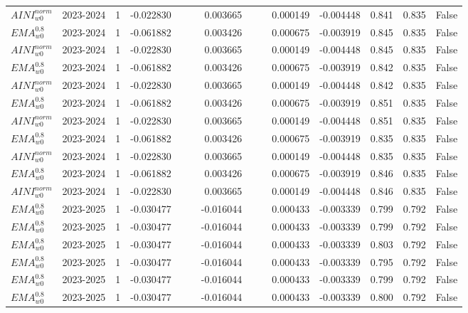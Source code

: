 \begin{tabular}{@{}llrrrrrrrrrlll@{}}
$AINI^{norm}_{w0}$ & 2023-2024 & 1 & -0.022830 &  &  & 0.003665 &  &  & 0.000149 & -0.004448 & 0.841 & 0.835 & False \\
$EMA^{0.8}_{w0}$ & 2023-2024 & 1 & -0.061882 &  &  & 0.003426 &  &  & 0.000675 & -0.003919 & 0.845 & 0.835 & False \\
$AINI^{norm}_{w0}$ & 2023-2024 & 1 & -0.022830 &  &  & 0.003665 &  &  & 0.000149 & -0.004448 & 0.845 & 0.835 & False \\
$EMA^{0.8}_{w0}$ & 2023-2024 & 1 & -0.061882 &  &  & 0.003426 &  &  & 0.000675 & -0.003919 & 0.842 & 0.835 & False \\
$AINI^{norm}_{w0}$ & 2023-2024 & 1 & -0.022830 &  &  & 0.003665 &  &  & 0.000149 & -0.004448 & 0.842 & 0.835 & False \\
$EMA^{0.8}_{w0}$ & 2023-2024 & 1 & -0.061882 &  &  & 0.003426 &  &  & 0.000675 & -0.003919 & 0.851 & 0.835 & False \\
$AINI^{norm}_{w0}$ & 2023-2024 & 1 & -0.022830 &  &  & 0.003665 &  &  & 0.000149 & -0.004448 & 0.851 & 0.835 & False \\
$EMA^{0.8}_{w0}$ & 2023-2024 & 1 & -0.061882 &  &  & 0.003426 &  &  & 0.000675 & -0.003919 & 0.835 & 0.835 & False \\
$AINI^{norm}_{w0}$ & 2023-2024 & 1 & -0.022830 &  &  & 0.003665 &  &  & 0.000149 & -0.004448 & 0.835 & 0.835 & False \\
$EMA^{0.8}_{w0}$ & 2023-2024 & 1 & -0.061882 &  &  & 0.003426 &  &  & 0.000675 & -0.003919 & 0.846 & 0.835 & False \\
$AINI^{norm}_{w0}$ & 2023-2024 & 1 & -0.022830 &  &  & 0.003665 &  &  & 0.000149 & -0.004448 & 0.846 & 0.835 & False \\
$EMA^{0.8}_{w0}$ & 2023-2025 & 1 & -0.030477 &  &  & -0.016044 &  &  & 0.000433 & -0.003339 & 0.799 & 0.792 & False \\
$EMA^{0.8}_{w0}$ & 2023-2025 & 1 & -0.030477 &  &  & -0.016044 &  &  & 0.000433 & -0.003339 & 0.799 & 0.792 & False \\
$EMA^{0.8}_{w0}$ & 2023-2025 & 1 & -0.030477 &  &  & -0.016044 &  &  & 0.000433 & -0.003339 & 0.803 & 0.792 & False \\
$EMA^{0.8}_{w0}$ & 2023-2025 & 1 & -0.030477 &  &  & -0.016044 &  &  & 0.000433 & -0.003339 & 0.795 & 0.792 & False \\
$EMA^{0.8}_{w0}$ & 2023-2025 & 1 & -0.030477 &  &  & -0.016044 &  &  & 0.000433 & -0.003339 & 0.799 & 0.792 & False \\
$EMA^{0.8}_{w0}$ & 2023-2025 & 1 & -0.030477 &  &  & -0.016044 &  &  & 0.000433 & -0.003339 & 0.800 & 0.792 & False \\

\end{tabular}
